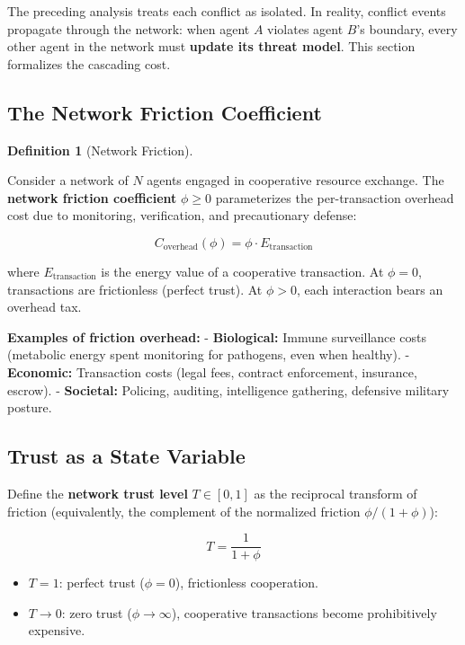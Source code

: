 \documentclass[11pt]{article}
\theoremstyle{plain}
\theoremstyle{definition}
\newtheorem{definition}{Definition}
\theoremstyle{remark}
\let\origsubsection\subsection
\renewcommand{\subsection}{\needspace{7\baselineskip}\origsubsection}
\providecommand{\tightlist}{%
  \setlength{\itemsep}{0pt}\setlength{\parskip}{0pt}}
\begin{document}
The preceding analysis treats each conflict as isolated. In reality,
conflict events propagate through the network: when agent \(A\) violates
agent \(B\)'s boundary, every other agent in the network must
\textbf{update its threat model}. This section formalizes the cascading
cost.

\subsection{The Network Friction
Coefficient}\label{the-network-friction-coefficient}

\begin{definition}[Network Friction]
\label{def-network-friction}

Consider a network of $N$ agents engaged in cooperative resource exchange. The \textbf{network friction coefficient} $\phi \geq 0$ parameterizes the per-transaction overhead cost due to monitoring, verification, and precautionary defense:

$$C_{\text{overhead}}(\phi) = \phi \cdot E_{\text{transaction}}$$

where $E_{\text{transaction}}$ is the energy value of a cooperative transaction. At $\phi = 0$, transactions are frictionless (perfect trust). At $\phi > 0$, each interaction bears an overhead tax.
\end{definition}

\textbf{Examples of friction overhead:} - \textbf{Biological:} Immune
surveillance costs (metabolic energy spent monitoring for pathogens,
even when healthy). - \textbf{Economic:} Transaction costs (legal fees,
contract enforcement, insurance, escrow). - \textbf{Societal:} Policing,
auditing, intelligence gathering, defensive military posture.

\subsection{Trust as a State Variable}\label{trust-as-a-state-variable}

Define the \textbf{network trust level} \(T \in [0, 1]\) as the
reciprocal transform of friction (equivalently, the complement of the
normalized friction \(\phi/(1+\phi)\)):

\[T = \frac{1}{1 + \phi}\]

\begin{itemize}
\tightlist
\item
  \(T = 1\): perfect trust (\(\phi = 0\)), frictionless cooperation.
\item
  \(T \to 0\): zero trust (\(\phi \to \infty\)), cooperative
  transactions become prohibitively expensive.
\end{itemize}
\end{document}
